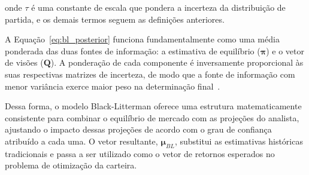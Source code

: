 \noindent onde $\tau$ é uma constante de escala que pondera a incerteza da distribuição de partida, e os demais termos seguem as definições anteriores.

A Equação~\eqref{eq:bl_posterior} funciona fundamentalmente como uma média ponderada das duas fontes de informação: a estimativa de equilíbrio ($\boldsymbol{\pi}$) e o vetor de visões ($\mathbf{Q}$). A ponderação de cada componente é inversamente proporcional às suas respectivas matrizes de incerteza, de modo que a fonte de informação com menor variância exerce maior peso na determinação final~\cite{meucci2005}.

Dessa forma, o modelo Black-Litterman oferece uma estrutura matematicamente consistente para combinar o equilíbrio de mercado com as projeções do analista, ajustando o impacto dessas projeções de acordo com o grau de confiança atribuído a cada uma. O vetor resultante, $\boldsymbol{\mu}_{BL}$, substitui as estimativas históricas tradicionais e passa a ser utilizado como o vetor de retornos esperados no problema de otimização da carteira.

